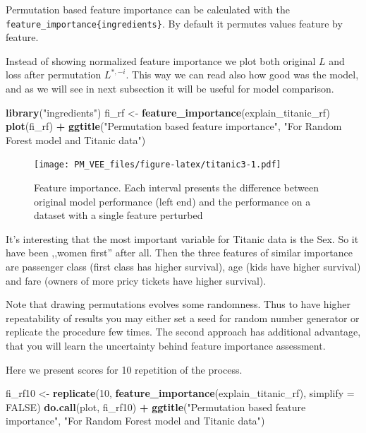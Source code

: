 \documentclass[12pt,]{krantz}
\newenvironment{Shaded}{\begin{snugshade}}{\end{snugshade}}
\newcommand{\DataTypeTok}[1]{\textcolor[rgb]{0.13,0.29,0.53}{#1}}
\newcommand{\DecValTok}[1]{\textcolor[rgb]{0.00,0.00,0.81}{#1}}
\newcommand{\KeywordTok}[1]{\textcolor[rgb]{0.13,0.29,0.53}{\textbf{#1}}}
\newcommand{\NormalTok}[1]{#1}
\newcommand{\OperatorTok}[1]{\textcolor[rgb]{0.81,0.36,0.00}{\textbf{#1}}}
\newcommand{\OtherTok}[1]{\textcolor[rgb]{0.56,0.35,0.01}{#1}}
\newcommand{\StringTok}[1]{\textcolor[rgb]{0.31,0.60,0.02}{#1}}
\theoremstyle{definition}
\theoremstyle{definition}
\theoremstyle{definition}
\theoremstyle{remark}
\begin{document}
Permutation based feature importance can be calculated with the
\texttt{feature\_importance\{ingredients\}}. By default it permutes
values feature by feature.

Instead of showing normalized feature importance we plot both original
\(L\) and loss after permutation \(L^{*,-i}\). This way we can read also
how good was the model, and as we will see in next subsection it will be
useful for model comparison.

\begin{Shaded}
\begin{Highlighting}[]
\KeywordTok{library}\NormalTok{(}\StringTok{"ingredients"}\NormalTok{)}
\NormalTok{fi_rf <-}\StringTok{ }\KeywordTok{feature_importance}\NormalTok{(explain_titanic_rf) }
\KeywordTok{plot}\NormalTok{(fi_rf) }\OperatorTok{+}\StringTok{ }\KeywordTok{ggtitle}\NormalTok{(}\StringTok{"Permutation based feature importance"}\NormalTok{, }\StringTok{"For Random Forest model and Titanic data"}\NormalTok{)}
\end{Highlighting}
\end{Shaded}

\begin{figure}
\centering
\texttt{[image: PM\_VEE\_files/figure-latex/titanic3-1.pdf]}
\caption{\label{fig:titanic3}Feature importance. Each interval presents the
difference between original model performance (left end) and the
performance on a dataset with a single feature perturbed}
\end{figure}

It's interesting that the most important variable for Titanic data is
the Sex. So it have been ,,women first'' after all. Then the three
features of similar importance are passenger class (first class has
higher survival), age (kids have higher survival) and fare (owners of
more pricy tickets have higher survival).

Note that drawing permutations evolves some randomness. Thus to have
higher repeatability of results you may either set a seed for random
number generator or replicate the procedure few times. The second
approach has additional advantage, that you will learn the uncertainty
behind feature importance assessment.

Here we present scores for 10 repetition of the process.

\begin{Shaded}
\begin{Highlighting}[]
\NormalTok{fi_rf10 <-}\StringTok{ }\KeywordTok{replicate}\NormalTok{(}\DecValTok{10}\NormalTok{, }\KeywordTok{feature_importance}\NormalTok{(explain_titanic_rf), }\DataTypeTok{simplify =} \OtherTok{FALSE}\NormalTok{)}
\KeywordTok{do.call}\NormalTok{(plot, fi_rf10) }\OperatorTok{+}\StringTok{ }\KeywordTok{ggtitle}\NormalTok{(}\StringTok{"Permutation based feature importance"}\NormalTok{, }\StringTok{"For Random Forest model and Titanic data"}\NormalTok{)}
\end{Highlighting}
\end{Shaded}
\end{document}
